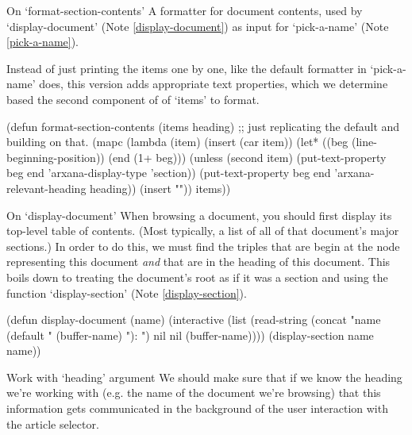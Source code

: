 \begin{notate}{On `format-section-contents'} \label{format-section-contents}
A formatter for document contents, used by
`display-document' (Note \ref{display-document}) as input
for `pick-a-name' (Note \ref{pick-a-name}).

Instead of just printing the items one by one,
like the default formatter in `pick-a-name'  does,
this version adds appropriate text properties, which
we determine based the second component of
of `items' to format.
\end{notate}

\begin{elisp}
(defun format-section-contents (items heading)
  ;; just replicating the default and building on that.
  (mapc (lambda (item)
          (insert (car item))
          (let* ((beg (line-beginning-position))
                 (end (1+ beg)))
            (unless (second item)
              (put-text-property beg end
                                 'arxana-display-type
                                 'section))
            (put-text-property beg end
                               'arxana-relevant-heading
                               heading))
          (insert "\n"))
        items))
\end{elisp}

\begin{notate}{On `display-document'} \label{display-document}
When browsing a document, you should first display its
top-level table of contents.  (Most typically, a list of
all of that document's major sections.)  In order to do
this, we must find the triples that are begin at the node
representing this document \emph{and} that are in the
heading of this document.  This boils down to treating the
document's root as if it was a section and using the
function `display-section' (Note \ref{display-section}).
\end{notate}

\begin{elisp}
(defun display-document (name)
  (interactive (list (read-string
                      (concat
                       "name (default "
                       (buffer-name) "): ")
                      nil nil (buffer-name))))
  (display-section name name))
\end{elisp}

\begin{notate}{Work with `heading' argument}
We should make sure that if we know the heading we're
working with (e.g. the name of the document we're
browsing) that this information gets communicated in the
background of the user interaction with the article
selector.
\end{notate}


